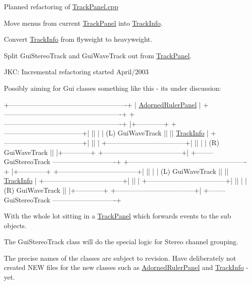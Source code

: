 Planned refactoring of \hyperlink{_track_panel_8cpp}{Track\+Panel.\+cpp}


\begin{DoxyItemize}
\item Move menus from current \hyperlink{class_track_panel}{Track\+Panel} into \hyperlink{class_track_info}{Track\+Info}.
\item Convert \hyperlink{class_track_info}{Track\+Info} from \textquotesingle{}flyweight\textquotesingle{} to heavyweight.
\item Split Gui\+Stereo\+Track and Gui\+Wave\+Track out from \hyperlink{class_track_panel}{Track\+Panel}.

J\+KC\+: Incremental refactoring started April/2003

Possibly aiming for Gui classes something like this -\/ it\textquotesingle{}s under discussion\+:
\end{DoxyItemize}


\begin{DoxyPre}
   +----------------------------------------------------+
   |      \hyperlink{class_adorned_ruler_panel}{AdornedRulerPanel}                             |
   +----------------------------------------------------+
   +----------------------------------------------------+
   |+------------+ +-----------------------------------+|
   ||            | | (L)  GuiWaveTrack                 ||
   || \hyperlink{class_track_info}{TrackInfo}  | +-----------------------------------+|
   ||            | +-----------------------------------+|
   ||            | | (R)  GuiWaveTrack                 ||
   |+------------+ +-----------------------------------+|
   +-------- GuiStereoTrack ----------------------------+
   +----------------------------------------------------+
   |+------------+ +-----------------------------------+|
   ||            | | (L)  GuiWaveTrack                 ||
   || \hyperlink{class_track_info}{TrackInfo}  | +-----------------------------------+|
   ||            | +-----------------------------------+|
   ||            | | (R)  GuiWaveTrack                 ||
   |+------------+ +-----------------------------------+|
   +-------- GuiStereoTrack ----------------------------+
\end{DoxyPre}


With the whole lot sitting in a \hyperlink{class_track_panel}{Track\+Panel} which forwards events to the sub objects.

The Gui\+Stereo\+Track class will do the special logic for Stereo channel grouping.

The precise names of the classes are subject to revision. Have deliberately not created N\+EW files for the new classes such as \hyperlink{class_adorned_ruler_panel}{Adorned\+Ruler\+Panel} and \hyperlink{class_track_info}{Track\+Info} -\/ yet. 